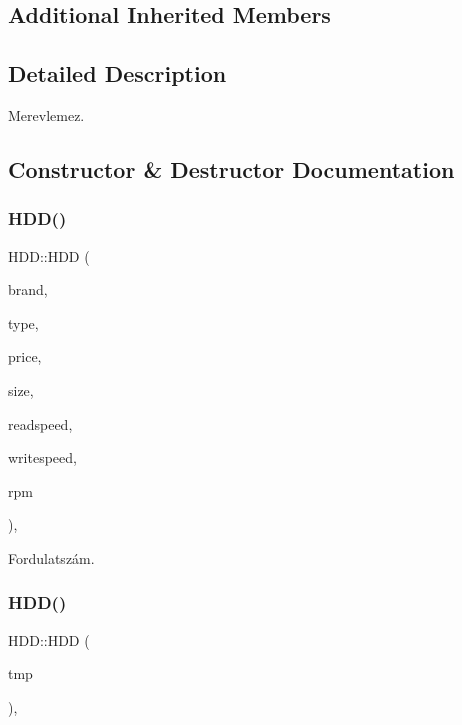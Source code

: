 \subsection*{Additional Inherited Members}


\subsection{Detailed Description}
Merevlemez. 

\subsection{Constructor \& Destructor Documentation}
\mbox{\label{class_h_d_d_a375ad923cb64a11afc261fe1fac5276c}} 
\subsubsection{\texorpdfstring{HDD()}{HDD()}\hspace{0.1cm}{\footnotesize\ttfamily [1/2]}}
{\footnotesize\ttfamily H\+D\+D\+::\+H\+DD (\begin{DoxyParamCaption}\item[{\mbox{\hyperlink{class_string}{String}}}]{brand,  }\item[{\mbox{\hyperlink{class_string}{String}}}]{type,  }\item[{int}]{price,  }\item[{int}]{size,  }\item[{int}]{readspeed,  }\item[{int}]{writespeed,  }\item[{int}]{rpm }\end{DoxyParamCaption})\hspace{0.3cm}{\ttfamily [inline]}, {\ttfamily [explicit]}}



Fordulatszám. 

\mbox{\label{class_h_d_d_a98374b087d6a74476b914dedb2de1ec4}} 
\subsubsection{\texorpdfstring{HDD()}{HDD()}\hspace{0.1cm}{\footnotesize\ttfamily [2/2]}}
{\footnotesize\ttfamily H\+D\+D\+::\+H\+DD (\begin{DoxyParamCaption}\item[{\mbox{\hyperlink{struct_temp_input}{Temp\+Input}}}]{tmp }\end{DoxyParamCaption})\hspace{0.3cm}{\ttfamily [inline]}, {\ttfamily [explicit]}}



